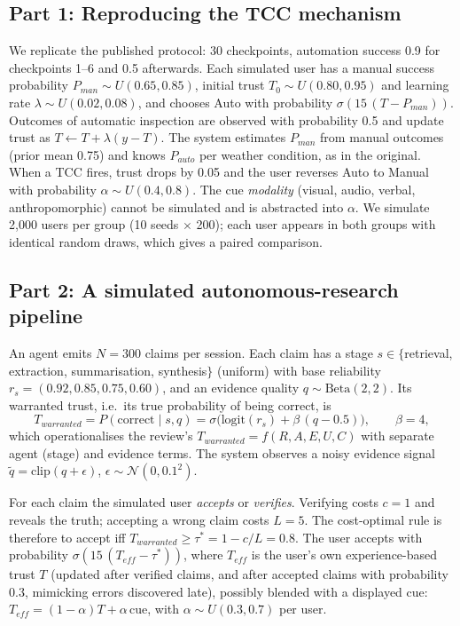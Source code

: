 \documentclass[10pt]{article}
\begin{document}
\subsection{Part 1: Reproducing the TCC mechanism}\label{sec:repro-method}
We replicate the published protocol: 30 checkpoints, automation success 0.9 for checkpoints 1--6 and 0.5 afterwards. Each simulated user has a manual success probability $P_{man}\sim U(0.65,0.85)$, initial trust $T_0\sim U(0.80,0.95)$ and learning rate $\lambda\sim U(0.02,0.08)$, and chooses Auto with probability $\sigma(15\,(T-P_{man}))$. Outcomes of automatic inspection are observed with probability 0.5 and update trust as $T\leftarrow T+\lambda(y-T)$. The system estimates $P_{man}$ from manual outcomes (prior mean 0.75) and knows $P_{auto}$ per weather condition, as in the original. When a TCC fires, trust drops by 0.05 and the user reverses Auto to Manual with probability $\alpha\sim U(0.4,0.8)$. The cue \emph{modality} (visual, audio, verbal, anthropomorphic) cannot be simulated and is abstracted into $\alpha$. We simulate 2{,}000 users per group (10 seeds $\times$ 200); each user appears in both groups with identical random draws, which gives a paired comparison.

\subsection{Part 2: A simulated autonomous-research pipeline}
An agent emits $N=300$ claims per session. Each claim has a stage $s\in\{$retrieval, extraction, summarisation, synthesis$\}$ (uniform) with base reliability $r_s=(0.92,0.85,0.75,0.60)$, and an evidence quality $q\sim\mathrm{Beta}(2,2)$. Its warranted trust, i.e.\ its true probability of being correct, is
\begin{equation}
T_{warranted}=P(\text{correct}\mid s,q)=\sigma\big(\mathrm{logit}(r_s)+\beta\,(q-0.5)\big),\qquad \beta=4,
\end{equation}
which operationalises the review's $T_{warranted}=f(R,A,E,U,C)$ with separate agent (stage) and evidence terms. The system observes a noisy evidence signal $\tilde q=\mathrm{clip}(q+\epsilon)$, $\epsilon\sim\mathcal N(0,0.1^2)$.

For each claim the simulated user \emph{accepts} or \emph{verifies}. Verifying costs $c=1$ and reveals the truth; accepting a wrong claim costs $L=5$. The cost-optimal rule is therefore to accept iff $T_{warranted}\ge\tau^*=1-c/L=0.8$. The user accepts with probability $\sigma(15\,(T_{eff}-\tau^*))$, where $T_{eff}$ is the user's own experience-based trust $T$ (updated after verified claims, and after accepted claims with probability 0.3, mimicking errors discovered late), possibly blended with a displayed cue: $T_{eff}=(1-\alpha)T+\alpha\,\mathrm{cue}$, with $\alpha\sim U(0.3,0.7)$ per user.
\end{document}
